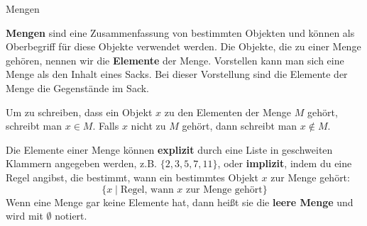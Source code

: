 \documentclass[../../main.tex]{subfiles}
\begin{document}
\begin{nutshell}{Mengen}

    \textbf{Mengen} sind eine Zusammenfassung von bestimmten Objekten und können als Oberbegriff für diese Objekte verwendet werden. Die Objekte, die zu einer Menge gehören, nennen wir die \textbf{Elemente} der Menge. Vorstellen kann man sich eine Menge als den Inhalt eines Sacks. Bei dieser Vorstellung sind die Elemente der Menge die Gegenstände im Sack.

    Um zu schreiben, dass ein Objekt $x$ zu den Elementen der Menge $M$ gehört, schreibt man $x\in M$. Falls $x$ nicht zu $M$ gehört, dann schreibt man $x\notin M$.

    Die Elemente einer Menge können \textbf{explizit} durch eine Liste in geschweiten Klammern angegeben werden, z.B. $\{2,3,5,7,11\}$,
    oder \textbf{implizit}, indem du eine Regel angibst, die bestimmt, wann ein bestimmtes Objekt $x$ zur Menge gehört:
    \[\{x\mid \text{Regel,~wann~}x\text{~zur~Menge~gehört}\}\]
    Wenn eine Menge gar keine Elemente hat, dann heißt sie die \textbf{leere Menge} und wird mit $\emptyset$ notiert.
\end{nutshell}
\end{document}
